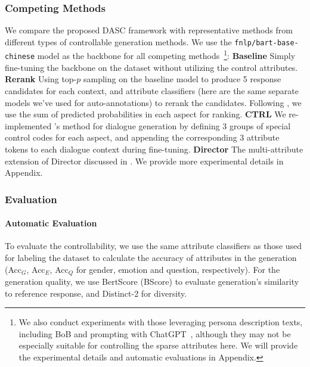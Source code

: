 \subsubsection{Competing Methods}
We compare the proposed DASC framework with representative methods from different types of controllable generation methods. We use the \texttt{fnlp/bart-base-chinese} \citep{shao2021cpt} model as the backbone for all competing methods~\footnote{We also conduct experiments with those leveraging persona description texts, including BoB \cite{song2021bob} and prompting with ChatGPT~\cite{openai2022:chatgpt}, although they may not be especially suitable for controlling the sparse attributes here. We will provide the experimental details and automatic evaluations in Appendix.}:
\textbf{Baseline} Simply fine-tuning the backbone on the dataset without utilizing the control attributes.
\textbf{Rerank} Using top-$p$ sampling \citep{holtzman2019curious} on the baseline model to produce 5 response candidates for each context, and attribute classifiers (here are the same separate models we've used for auto-annotations) to rerank the candidates. Following \citet{thoppilan2022lamda}, we use the sum of predicted probabilities in each aspect for ranking. 
\textbf{CTRL} We re-implemented \citet{keskar2019ctrl}'s method for dialogue generation by defining 3 groups of special control codes for each aspect, and appending the corresponding 3 attribute tokens to each dialogue context during fine-tuning.
\textbf{Director} The multi-attribute extension of Director \citep{arora2022director} discussed in . We provide more experimental details in Appendix.

\subsubsection{Evaluation}
\paragraph{Automatic Evaluation} To evaluate the controllability, we use the same attribute classifiers as those used for labeling the dataset to calculate the accuracy of attributes in the generation (Acc$_G$, Acc$_E$, Acc$_Q$ for gender, emotion and question, respectively). For the generation quality, we use BertScore (BScore) \cite{zhang2019bertscore} to evaluate generation's similarity to reference response, and Distinct-2 \cite{li2016diversity} for diversity. 

